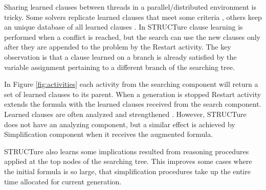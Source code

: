 Sharing learned clauses between threads in a parallel/distributed
environment is tricky.  Some solvers replicate learned clauses that
meet some criteria \cite{Hamadi09manysat:a}, others keep an unique
database of all learned clauses \cite{mine:miraxt}.  In STRUCTure
clause learning is performed when a conflict is reached, but the
search can use the new clauses only after they are appended to
the problem by the Restart activity.  The key observation is that
a clause learned on a branch is already satisfied by the variable
assignment pertaining to a different branch of the searching tree.

In Figure \ref{fig:activities} each activity from the
searching component will return a set of learned clauses to its
parent. When a generation is stopped Restart activity extends
the formula with the learned clauses received from the search
component.  Learned clauses are often analyzed and strengthened
\cite{Audemard_ageneralized}. However, STRUCTure does not have
an analyzing component, but a similar effect is achieved by
Simplification component when it receives the augmented formula.

STRUCTure also learns some implications resulted from reasoning
procedures applied at the top nodes of the searching tree. This
improves some cases where the initial formula is so large, that
simplification procedures take up the entire time allocated for
current generation.

